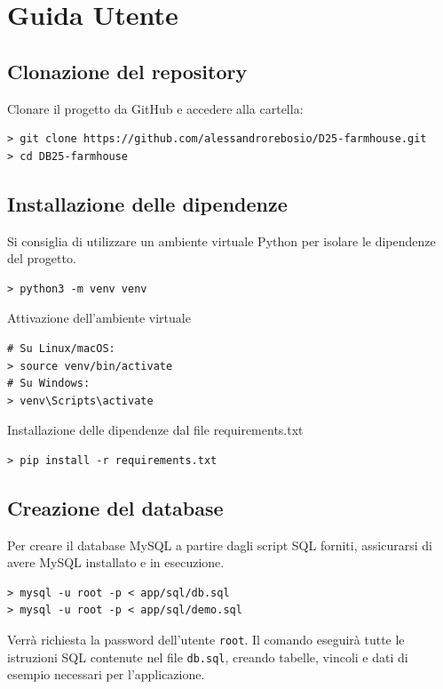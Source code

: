 \documentclass[a4paper,12pt]{report}
\begin{document}
\appendix
\chapter{Guida Utente}

\section{Clonazione del repository}
Clonare il progetto da GitHub e accedere alla cartella:

\begin{verbatim}
> git clone https://github.com/alessandrorebosio/D25-farmhouse.git
> cd DB25-farmhouse
\end{verbatim}

\section{Installazione delle dipendenze}

Si consiglia di utilizzare un ambiente virtuale Python per isolare le dipendenze del progetto.

\begin{verbatim}
> python3 -m venv venv
\end{verbatim}

\noindent Attivazione dell'ambiente virtuale
\begin{verbatim}
# Su Linux/macOS:
> source venv/bin/activate
# Su Windows:
> venv\Scripts\activate
\end{verbatim}

\noindent Installazione delle dipendenze dal file requirements.txt
\begin{verbatim}
> pip install -r requirements.txt
\end{verbatim}

\section{Creazione del database}

Per creare il database MySQL a partire dagli script SQL forniti, assicurarsi di avere MySQL
installato e in esecuzione.

\begin{verbatim}
> mysql -u root -p < app/sql/db.sql
> mysql -u root -p < app/sql/demo.sql
\end{verbatim}

Verrà richiesta la password dell'utente \texttt{root}. Il comando eseguirà tutte le
istruzioni SQL contenute nel file \texttt{db.sql}, creando tabelle, vincoli e dati di
esempio necessari per l'applicazione.
\end{document}
